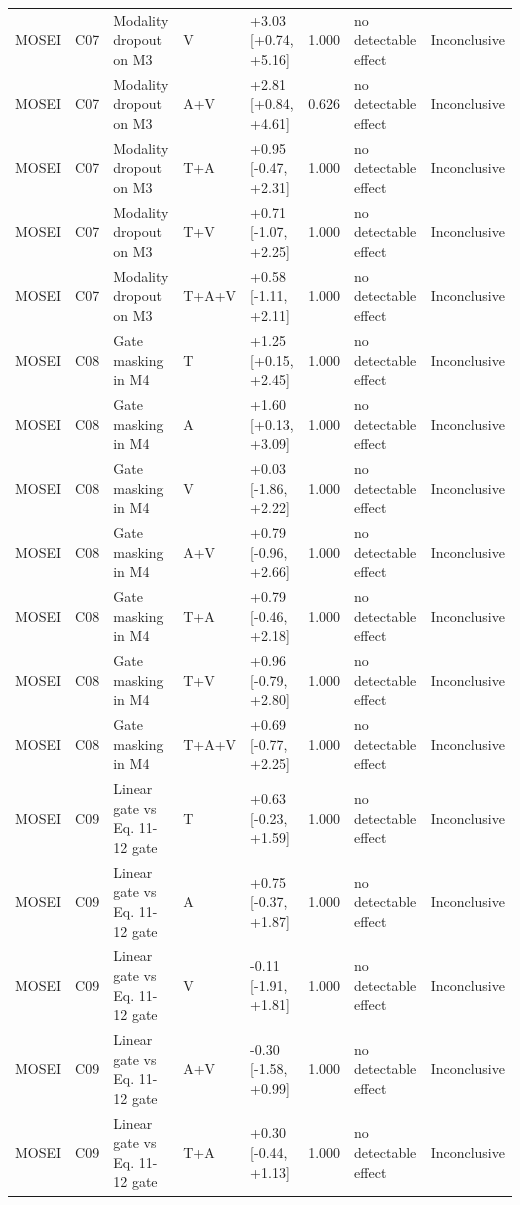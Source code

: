 \begin{landscape}
{\begin{xltabular}{\linewidth}{ll>{\raggedright\arraybackslash}Xlll>{\raggedright\arraybackslash}X>{\raggedright\arraybackslash}X}
MOSEI & C07 & Modality dropout on M3 & V & +3.03 [+0.74, +5.16] & 1.000 & no detectable effect & Inconclusive \\
MOSEI & C07 & Modality dropout on M3 & A+V & +2.81 [+0.84, +4.61] & 0.626 & no detectable effect & Inconclusive \\
MOSEI & C07 & Modality dropout on M3 & T+A & +0.95 [-0.47, +2.31] & 1.000 & no detectable effect & Inconclusive \\
MOSEI & C07 & Modality dropout on M3 & T+V & +0.71 [-1.07, +2.25] & 1.000 & no detectable effect & Inconclusive \\
MOSEI & C07 & Modality dropout on M3 & T+A+V & +0.58 [-1.11, +2.11] & 1.000 & no detectable effect & Inconclusive \\
MOSEI & C08 & Gate masking in M4 & T & +1.25 [+0.15, +2.45] & 1.000 & no detectable effect & Inconclusive \\
MOSEI & C08 & Gate masking in M4 & A & +1.60 [+0.13, +3.09] & 1.000 & no detectable effect & Inconclusive \\
MOSEI & C08 & Gate masking in M4 & V & +0.03 [-1.86, +2.22] & 1.000 & no detectable effect & Inconclusive \\
MOSEI & C08 & Gate masking in M4 & A+V & +0.79 [-0.96, +2.66] & 1.000 & no detectable effect & Inconclusive \\
MOSEI & C08 & Gate masking in M4 & T+A & +0.79 [-0.46, +2.18] & 1.000 & no detectable effect & Inconclusive \\
MOSEI & C08 & Gate masking in M4 & T+V & +0.96 [-0.79, +2.80] & 1.000 & no detectable effect & Inconclusive \\
MOSEI & C08 & Gate masking in M4 & T+A+V & +0.69 [-0.77, +2.25] & 1.000 & no detectable effect & Inconclusive \\
MOSEI & C09 & Linear gate vs Eq. 11-12 gate & T & +0.63 [-0.23, +1.59] & 1.000 & no detectable effect & Inconclusive \\
MOSEI & C09 & Linear gate vs Eq. 11-12 gate & A & +0.75 [-0.37, +1.87] & 1.000 & no detectable effect & Inconclusive \\
MOSEI & C09 & Linear gate vs Eq. 11-12 gate & V & -0.11 [-1.91, +1.81] & 1.000 & no detectable effect & Inconclusive \\
MOSEI & C09 & Linear gate vs Eq. 11-12 gate & A+V & -0.30 [-1.58, +0.99] & 1.000 & no detectable effect & Inconclusive \\
MOSEI & C09 & Linear gate vs Eq. 11-12 gate & T+A & +0.30 [-0.44, +1.13] & 1.000 & no detectable effect & Inconclusive \\

\end{xltabular}}
\end{landscape}
